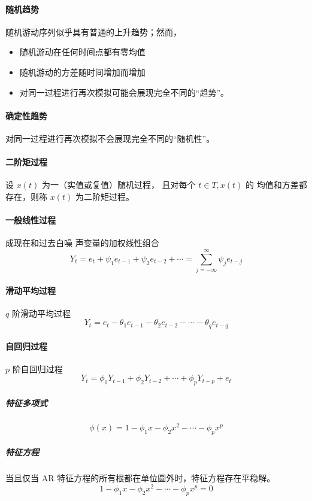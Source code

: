 \documentclass[UTF8,hyperref,a4paper,twoside]{ctexart}
\begin{document}
        \paragraph{随机趋势} 随机游动序列似乎具有普通的上升趋势；然而，
        \begin{itemize}
            \item 随机游动在任何时间点都有零均值
            \item 随机游动的方差随时间增加而增加
            \item 对同一过程进行再次模拟可能会展现完全不同的“趋势”。
        \end{itemize}

        \paragraph{确定性趋势} 对同一过程进行再次模拟不会展现完全不同的“随机性”。

        \paragraph{二阶矩过程} 设 $ {x(t)} $ 为一（实值或复值）随机过程，
        且对每个 $  t ∈T, {x(t)}  $ 的 均值和方差都存在，则称 $ {x(t)} $ 为二阶矩过程。

        \paragraph{一般线性过程} 成现在和过去白噪 声变量的加权线性组合
        $$ Y_t = e_t + ψ_1 e_{t-1} + ψ_2 e_{t-2} + ⋯
               = ∑_{j=-∞}^∞ ψ_j e_{t-j} $$
        
        \paragraph{滑动平均过程}  $ q $ 阶滑动平均过程
        $$ Y_t = e_t - θ_1 e_{t-1} - θ_2 e_{t-2} - ⋯ - θ_q e_{t-q} $$

        \paragraph{自回归过程}  $ p $ 阶自回归过程
        $$ Y_t = ϕ_1 Y_{t-1} + ϕ_2 Y_{t-2} + ⋯ + ϕ_p Y_{t-p} + e_t $$ 

        \subparagraph{特征多项式} 
        $$ ϕ (x) = 1 - ϕ_1 x - ϕ_2 x^2 - ⋯ - ϕ_p x^p $$ 

        \subparagraph{特征方程} 当且仅当 AR 特征方程的所有根都在单位圆外时，特征方程存在平稳解。
        $$ 1 - ϕ_1 x - ϕ_2 x^2 - ⋯ - ϕ_p x^p = 0 $$
\end{document}
